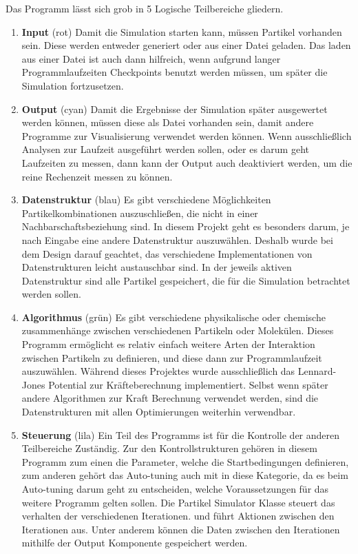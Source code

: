 \documentclass[
	12pt,
	a4paper,
	BCOR10mm,
	DIV14,
	headsepline,
]{scrreprt}
\begin{document}
Das Programm lässt sich grob in 5 Logische Teilbereiche gliedern.
\begin{enumerate}
	\item \textbf{Input} (rot) Damit die Simulation starten kann, müssen Partikel vorhanden sein. Diese werden entweder generiert oder aus einer Datei geladen. Das laden aus einer Datei ist auch dann hilfreich, wenn aufgrund langer Programmlaufzeiten Checkpoints benutzt werden müssen, um später die Simulation fortzusetzen.
	\item \textbf{Output} (cyan) Damit die Ergebnisse der Simulation später ausgewertet werden können, müssen diese als Datei vorhanden sein, damit andere Programme zur Visualisierung verwendet werden können. Wenn ausschließlich Analysen zur Laufzeit ausgeführt werden sollen, oder es darum geht Laufzeiten zu messen, dann kann der Output auch deaktiviert werden, um die reine Rechenzeit messen zu können.
	\item \textbf{Datenstruktur} (blau) Es gibt verschiedene Möglichkeiten Partikelkombinationen auszuschließen, die nicht in einer Nachbarschaftsbeziehung sind. In diesem Projekt geht es besonders darum, je nach Eingabe eine andere Datenstruktur auszuwählen. Deshalb wurde bei dem Design darauf geachtet, das verschiedene Implementationen von Datenstrukturen leicht austauschbar sind. In der jeweils aktiven Datenstruktur sind alle Partikel gespeichert, die für die Simulation betrachtet werden sollen.
	\item \textbf{Algorithmus} (grün) Es gibt verschiedene physikalische oder chemische zusammenhänge zwischen verschiedenen Partikeln oder Molekülen. Dieses Programm ermöglicht es relativ einfach weitere Arten der Interaktion zwischen Partikeln zu definieren, und diese dann zur Programmlaufzeit auszuwählen. Während dieses Projektes wurde ausschließlich das Lennard-Jones Potential zur Kräfteberechnung implementiert. Selbst wenn später andere Algorithmen zur Kraft Berechnung verwendet werden, sind die Datenstrukturen mit allen Optimierungen weiterhin verwendbar.
	\item \textbf{Steuerung} (lila) Ein Teil des Programms ist für die Kontrolle der anderen Teilbereiche Zuständig. Zur den Kontrollstrukturen gehören in diesem Programm zum einen die Parameter, welche die Startbedingungen definieren, zum anderen gehört das Auto-tuning auch mit in diese Kategorie, da es beim Auto-tuning darum geht zu entscheiden, welche Voraussetzungen für das weitere Programm gelten sollen. Die Partikel Simulator Klasse steuert das verhalten der verschiedenen Iterationen. und führt Aktionen zwischen den Iterationen aus. Unter anderem können die Daten zwischen den Iterationen mithilfe der Output Komponente gespeichert werden.
\end{enumerate}
\end{document}
